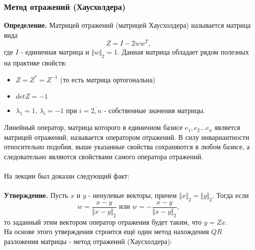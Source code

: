 \documentclass[a4paper,12pt,titlepage,final]{article}
\begin{document}
\subsubsection{Метод отражений (Хаусхолдера)}
\textbf{Определение.} Матрицей отражений (матрицей Хаусхолдера) называется матрица вида $$Z = I - 2 ww^T,$$ где $I$ - единичная матрица и $\Vert w \Vert_2 = 1$. Данная матрица обладает рядом полезных на практике свойств:
\begin{itemize}
    \item $Z = Z^* = Z^{-1}$ (то есть матрица ортогональна)
    \item $detZ = -1$
    \item $\lambda_1 = 1$, $\lambda_i = -1$ при $i = \overline{2, n}$ - собственные значения матрицы.
\end{itemize}
Линейный оператор, матрица которого в единичном базисе $e_1, e_2 \ldots e_n$ является матрицей отражений, называется оператором отражений. В силу инвариантности относительно подобия, выше указанные свойства сохраняются в любом базисе, а следовательно являются свойствами самого оператора отражений. \\ \\
На лекции был доказан следующий факт: \\ \\
\textbf{Утверждение.} Пусть $x$ и $y$ - ненулевые векторы, причем $\Vert x \Vert_2 = \Vert y \Vert_2$. Тогда если $$w = \frac{x - y}{\Vert x - y\Vert_2} \text{ или } w = -\frac{x - y}{\Vert x - y\Vert_2},$$
то заданный этим вектором оператор отражения будет таким, что $y = Zx$. \\ На основе этого утверждения строится ещё один метод нахождения $QR$ разложения матрицы - метод отражений (Хаусхолдера): \\ \\
\end{document}
